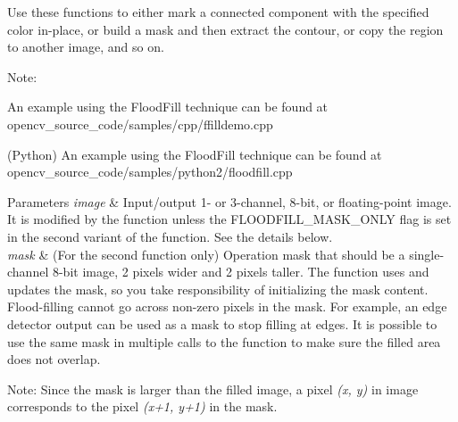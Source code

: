 Use these functions to either mark a connected component with the specified color in-\/place, or build a mask and then extract the contour, or copy the region to another image, and so on.

Note\+:


\begin{DoxyItemize}
\item An example using the Flood\+Fill technique can be found at opencv\+\_\+source\+\_\+code/samples/cpp/ffilldemo.\+cpp 
\item (Python) An example using the Flood\+Fill technique can be found at opencv\+\_\+source\+\_\+code/samples/python2/floodfill.\+cpp 
\end{DoxyItemize}


\begin{DoxyParams}{Parameters}
{\em image} & Input/output 1-\/ or 3-\/channel, 8-\/bit, or floating-\/point image. It is modified by the function unless the {\ttfamily F\+L\+O\+O\+D\+F\+I\+L\+L\+\_\+\+M\+A\+S\+K\+\_\+\+O\+N\+LY} flag is set in the second variant of the function. See the details below. \\
\hline
{\em mask} & (For the second function only) Operation mask that should be a single-\/channel 8-\/bit image, 2 pixels wider and 2 pixels taller. The function uses and updates the mask, so you take responsibility of initializing the {\ttfamily mask} content. Flood-\/filling cannot go across non-\/zero pixels in the mask. For example, an edge detector output can be used as a mask to stop filling at edges. It is possible to use the same mask in multiple calls to the function to make sure the filled area does not overlap.\\
\hline
\end{DoxyParams}


Note\+: Since the mask is larger than the filled image, a pixel {\itshape (x, y)} in {\ttfamily image} corresponds to the pixel {\itshape (x+1, y+1)} in the {\ttfamily mask}.


